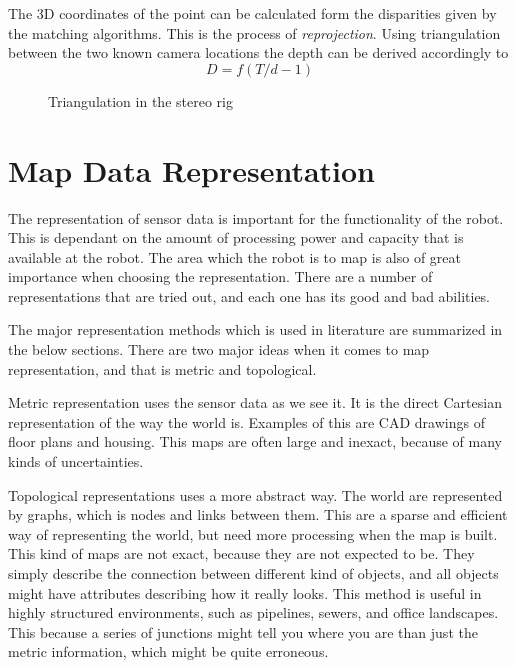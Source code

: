The 3D coordinates of the point can be calculated form the disparities given by the
matching algorithms. This is the process of \emph{reprojection}. Using triangulation
between the two known camera locations the depth can be derived accordingly to 
\begin{equation}
    D = f (T / d - 1)
\end{equation}

\begin{figure}[htbp]
    \centering
    \caption{Triangulation in the stereo rig}
    \label{chap2:fig-stereo-triangulation}
\end{figure}




\section{Map Data Representation}
The representation of sensor data is important for the functionality of the robot. This is
dependant on the amount of processing power and capacity that is available at the robot.
The area which the robot is to map is also of great importance when choosing the
representation. There are a number of representations that are tried out, and each one has its good and
bad abilities. 

The major representation methods which is used in literature are summarized in the below
sections. There are two major ideas when it comes to map representation, and that is
metric and topological.

Metric representation uses the sensor data as we see it. It is the direct Cartesian
representation of the way the world is. Examples of this are CAD drawings of floor plans
and housing. This maps are often large and inexact, because of many kinds of
uncertainties.

Topological representations uses a more abstract way. The world are represented by graphs,
which is nodes and links between them. This are a sparse and efficient way of representing
the world, but need more processing when the map is built. This kind of maps are not
exact, because they are not expected to be. They simply describe the connection between
different kind of objects, and all objects might have attributes describing how it really
looks. This method is useful in highly structured environments, such as pipelines, sewers,
and office landscapes. This because a series of junctions might tell you where you are
than just the metric information, which might be quite erroneous. 


